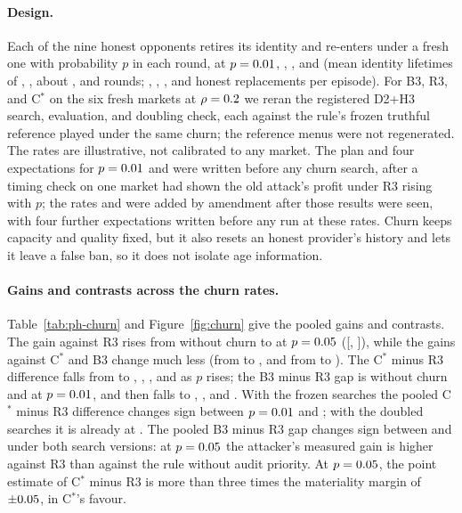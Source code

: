\documentclass[11pt]{article}
\begin{document}
\paragraph{Design.} Each of the nine honest opponents retires its identity and re-enters under a fresh one with probability $p$ in each round, at $p = 0.01$, , , and  (mean identity lifetimes of , , about , and  rounds; , , , and  honest replacements per episode). For B3, R3, and C$^*$ on the six fresh markets at $\rho=0.2$ we reran the registered D2+H3 search, evaluation, and doubling check, each against the rule's frozen truthful reference played under the same churn; the reference menus were not regenerated. The rates are illustrative, not calibrated to any market. The plan and four expectations for $p = 0.01$ and  were written before any churn search, after a timing check on one market had shown the old attack's profit under R3 rising with $p$; the rates  and  were added by amendment after those results were seen, with four further expectations written before any run at these rates. Churn keeps capacity and quality fixed, but it also resets an honest provider's history and lets it leave a false ban, so it does not isolate age information.

\paragraph{Gains and contrasts across the churn rates.} Table~\ref{tab:ph-churn} and Figure~\ref{fig:churn} give the pooled gains and contrasts. The gain against R3 rises from  without churn to  at $p = 0.05$ ([, ]), while the gains against C$^*$ and B3 change much less (from  to , and from  to ). The C$^*$ minus R3 difference falls from  to , , , and  as $p$ rises; the B3 minus R3 gap is  without churn and  at $p = 0.01$, and then falls to , , and . With the frozen searches the pooled C$^*$ minus R3 difference changes sign between $p = 0.01$ and ; with the doubled searches it is already  at . The pooled B3 minus R3 gap changes sign between  and  under both search versions: at $p = 0.05$ the attacker's measured gain is higher against R3 than against the rule without audit priority. At $p = 0.05$, the point estimate of C$^*$ minus R3 is more than three times the materiality margin of $\pm0.05$, in C$^*$'s favour.
\end{document}
